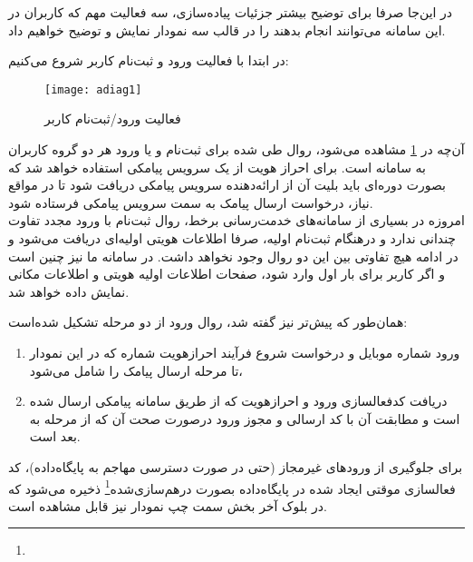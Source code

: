 در این‌جا صرفا برای توضیح بیشتر جزئیات پیاده‌سازی، سه فعالیت مهم که کاربران در این سامانه می‌توانند انجام بدهند را در قالب سه نمودار نمایش و توضیح خواهیم داد.


در ابتدا با فعالیت ورود و ثبت‌نام کاربر شروع می‌کنیم:

\begin{figure}[H]
	\centering
	\texttt{[image: adiag1]}
	\caption{فعالیت ورود/ثبت‌نام کاربر}
	\label{fig:adiag1}
\end{figure}

آن‌چه در \cref{fig:adiag1} مشاهده می‌شود، روال طی شده برای ثبت‌نام و یا ورود هر دو گروه کاربران به سامانه است. برای احراز هویت از یک سرویس پیامکی استفاده خواهد شد که بصورت دوره‌ای باید بلیت آن از ارائه‌دهنده سرویس پیامکی دریافت شود تا در مواقع نیاز، درخواست ارسال پیامک به سمت سرویس پیامکی فرستاده شود.\\

امروزه در بسیاری از سامانه‌های خدمت‌رسانی برخط، روال ثبت‌نام با ورود مجدد تفاوت چندانی ندارد و درهنگام ثبت‌نام اولیه، صرفا اطلاعات هویتی اولیه‌ای دریافت می‌شود و در ادامه هیچ تفاوتی بین این دو روال وجود نخواهد داشت. در سامانه ما نیز چنین است و اگر کاربر برای بار اول وارد شود، صفحات اطلاعات اولیه هویتی و اطلاعات مکانی نمایش داده خواهد شد.

همان‌طور که پیش‌تر نیز گفته شد، روال ورود از دو مرحله تشکیل شده‌است:
\begin{enumerate}
	\item ورود شماره موبایل و درخواست شروع فرآیند احرازهویت شماره که در این نمودار تا مرحله ارسال پیامک را شامل می‌شود،
	\item دریافت کدفعالسازی ورود و احرازهویت که از طریق سامانه پیامکی ارسال شده است و مطابقت آن با کد ارسالی و مجوز ورود درصورت صحت آن که از مرحله  به بعد است.
\end{enumerate}

برای جلوگیری از ورودهای غیرمجاز (حتی در صورت دسترسی مهاجم به پایگاه‌داده)، کد فعالسازی موقتی ایجاد شده در پایگاه‌داده بصورت درهم‌سازی‌شده\footnote{} ذخیره می‌شود که در بلوک آخر بخش سمت چپ نمودار نیز قابل مشاهده است.

\newpage



